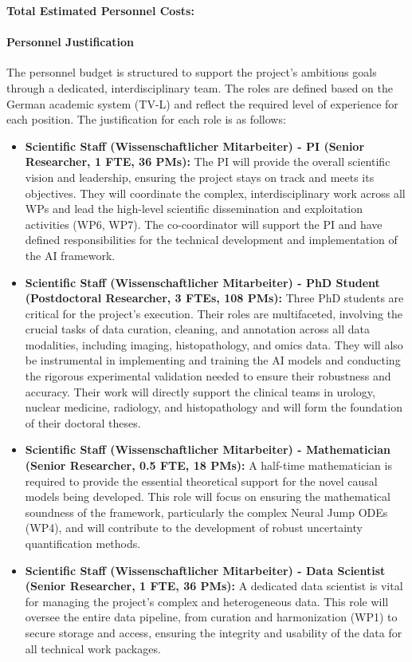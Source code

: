 \documentclass[11pt, a4paper]{article}
\begin{document}
\textbf{Total Estimated Personnel Costs: }

\paragraph{Personnel Justification}
The personnel budget is structured to support the project's ambitious goals through a dedicated, interdisciplinary team. The roles are defined based on the German academic system (TV-L) and reflect the required level of experience for each position. The justification for each role is as follows:
\begin{itemize}
    \item \textbf{Scientific Staff (Wissenschaftlicher Mitarbeiter) - PI (Senior Researcher, 1 FTE, 36 PMs):} The PI will provide the overall scientific vision and leadership, ensuring the project stays on track and meets its objectives. They will coordinate the complex, interdisciplinary work across all WPs and lead the high-level scientific dissemination and exploitation activities (WP6, WP7). The co-coordinator will support the PI and have defined responsibilities for the technical development and implementation of the AI framework.
    \item \textbf{Scientific Staff (Wissenschaftlicher Mitarbeiter) - PhD Student (Postdoctoral Researcher, 3 FTEs, 108 PMs):} Three PhD students are critical for the project's execution. Their roles are multifaceted, involving the crucial tasks of data curation, cleaning, and annotation across all data modalities, including imaging, histopathology, and omics data. They will also be instrumental in implementing and training the AI models and conducting the rigorous experimental validation needed to ensure their robustness and accuracy. Their work will directly support the clinical teams in urology, nuclear medicine, radiology, and histopathology and will form the foundation of their doctoral theses.
    \item \textbf{Scientific Staff (Wissenschaftlicher Mitarbeiter) - Mathematician (Senior Researcher, 0.5 FTE, 18 PMs):} A half-time mathematician is required to provide the essential theoretical support for the novel causal models being developed. This role will focus on ensuring the mathematical soundness of the framework, particularly the complex Neural Jump ODEs (WP4), and will contribute to the development of robust uncertainty quantification methods.
    \item \textbf{Scientific Staff (Wissenschaftlicher Mitarbeiter) - Data Scientist (Senior Researcher, 1 FTE, 36 PMs):} A dedicated data scientist is vital for managing the project's complex and heterogeneous data. This role will oversee the entire data pipeline, from curation and harmonization (WP1) to secure storage and access, ensuring the integrity and usability of the data for all technical work packages.

\end{itemize}
\end{document}
